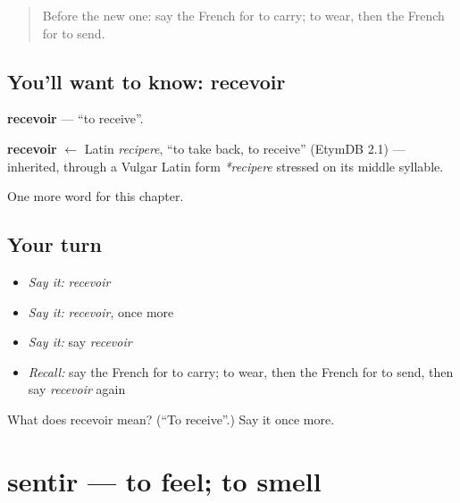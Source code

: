 \label{lesson:FR-C65-recevoir}



\begin{quote}
Before the new one: say the French for to carry; to wear, then the French for to send.
\end{quote}

\subsection*{You'll want to know: recevoir}
\textbf{recevoir} — \textquotedblleft{}to receive\textquotedblright{}.

\begin{cousinweb}
\textbf{recevoir} $\leftarrow$ Latin \emph{recipere}, \textquotedblleft{}to take back, to receive\textquotedblright{} (EtymDB 2.1) — inherited, through a Vulgar Latin form \emph{*recipere} stressed on its middle syllable.
\end{cousinweb}

\begin{grammarlens}[title={What you've built}]
One more word for this chapter.
\end{grammarlens}

\subsection*{Your turn}
\begin{itemize}
\raggedright
  \item \emph{Say it:} \emph{recevoir}
  \item \emph{Say it:} \emph{recevoir}, once more
  \item \emph{Say it:} say \emph{recevoir}
  \item \emph{Recall:} say the French for to carry; to wear, then the French for to send, then say \emph{recevoir} again
\end{itemize}

\begin{tcolorbox}[breakable,colback=teal!4,colframe=teal!35!black,title={Before you move on}]
What does recevoir mean? (\textquotedblleft{}To receive\textquotedblright{}.) Say it once more.
\end{tcolorbox}
\section[sentir]{sentir — to feel; to smell}

\label{lesson:FR-C65-sentir}



